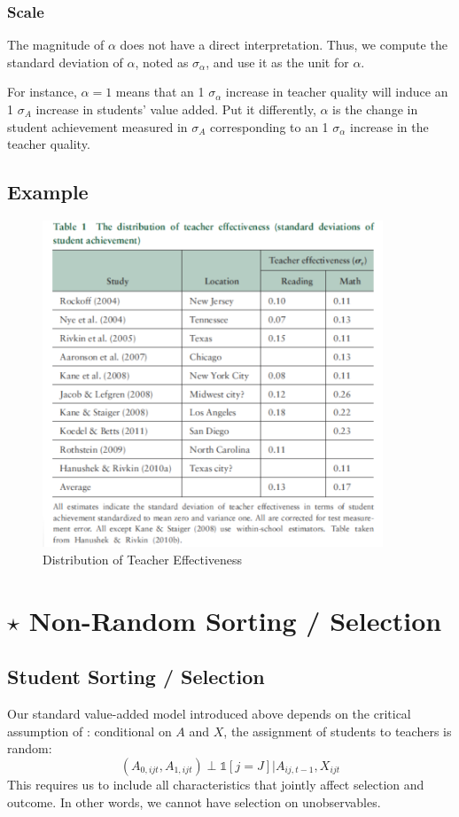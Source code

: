         \subsubsection{Scale}
            The magnitude of $\alpha$ does not have a direct interpretation. Thus, we compute the standard deviation of $\alpha$, noted as $\sigma_\alpha$, and use it as the unit for $\alpha$.

            For instance, $\alpha=1$ means that an 1 $\sigma_\alpha$ increase in teacher quality will induce an 1 $\sigma_A$ increase in students' value added. Put it differently, $\alpha$ is the change in student achievement measured in $\sigma_A$ corresponding to an 1 $\sigma_\alpha$ increase in the teacher quality.
        
    
    \subsection{Example}

        \begin{figure}[H]
            \centering
            \includegraphics[width=4in]{images/ch9/9 hanushek rivkin.png}
            \caption{Distribution of Teacher Effectiveness}
        \end{figure}
        

\section{$\star$ Non-Random Sorting / Selection}
    
    \subsection{Student Sorting / Selection}
        Our standard value-added model introduced above depends on the critical assumption of : conditional on $A$ and $X$, the assignment of students to teachers is random:
        $$(A_{0,ijt},A_{1,ijt})\perp \mathds{1}[j=J]|A_{ij,t-1},X_{ijt}$$
        This requires us to include all characteristics that jointly affect selection and outcome. In other words, we cannot have selection on unobservables.
        
